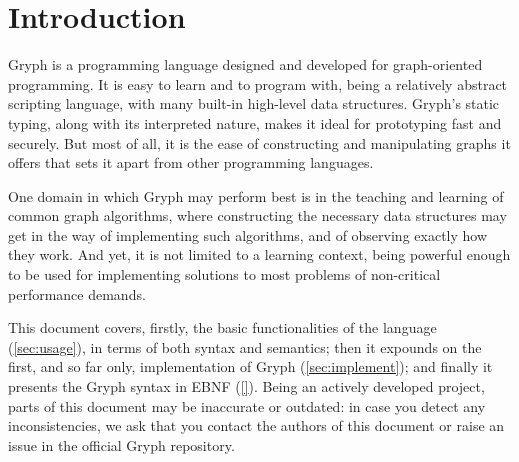 \section{Introduction}
\label{sec:intro}
Gryph is a programming language designed and developed for graph-oriented programming. It is easy to learn and to program with, being a relatively abstract scripting language, with many built-in high-level data structures. Gryph's static typing, along with its interpreted nature, makes it ideal for prototyping fast and securely. But most of all, it is the ease of constructing and manipulating graphs it offers that sets it apart from other programming languages.

One domain in which Gryph may perform best is in the teaching and learning of common graph algorithms, where constructing the necessary data structures may get in the way of implementing such algorithms, and of observing exactly how they work. And yet, it is not limited to a learning context, being powerful enough to be used for implementing solutions to most problems of non-critical performance demands.

This document covers, firstly, the basic functionalities of the language (\autoref{sec:usage}), in terms of both syntax and semantics; then it expounds on the first, and so far only, implementation of Gryph (\autoref{sec:implement}); and finally it presents the Gryph syntax in EBNF (\autoref{}). Being an actively developed project, parts of this document may be inaccurate or outdated: in case you detect any inconsistencies, we ask that you contact the authors of this document or raise an issue in the official Gryph repository.